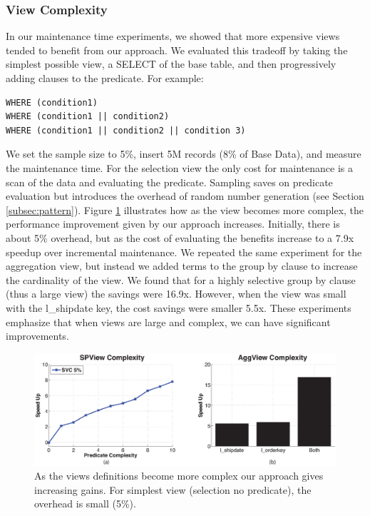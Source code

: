 \subsubsection{View Complexity}
In our maintenance time experiments, we showed that more expensive views tended to benefit from our approach.
We evaluated this tradeoff by taking the simplest possible view, a SELECT of the base table, and then progressively adding clauses to the predicate.
For example:
\begin{lstlisting}
WHERE (condition1)
WHERE (condition1 || condition2)
WHERE (condition1 || condition2 || condition 3)
\end{lstlisting}
We set the sample size to 5\%, insert 5M records (8\% of Base Data), and measure the maintenance time.
For the selection view the only cost for maintenance is a scan of the data and evaluating the predicate. 
Sampling saves on predicate evaluation but introduces the overhead of random number generation (see Section \ref{subsec:pattern}). 
Figure \ref{exp11overheads} illustrates how as the view becomes more complex, the performance improvement given
by our approach increases.
Initially, there is about 5\% overhead, but as the cost of evaluating the benefits increase to a 7.9x speedup over incremental maintenance.
We repeated the same experiment for the aggregation view, but instead we added terms to the group by clause to increase the
cardinality of the view.
We found that for a highly selective group by clause (thus a large view) the savings were 16.9x.
However, when the view was small with the l\_shipdate key, the cost savings were smaller 5.5x.
These experiments emphasize that when views are large and complex, we can have significant improvements.
\begin{figure}[ht!]
 \includegraphics[trim = 35mm 0mm 35mm 0mm, clip,width=\columnwidth]{exp/complexity_efficiency_tradeoff.eps}
 \caption{As the views definitions become more complex our approach gives increasing gains. For simplest view (selection no predicate), the overhead is small (5\%).\label{exp11overheads}}
\end{figure}


